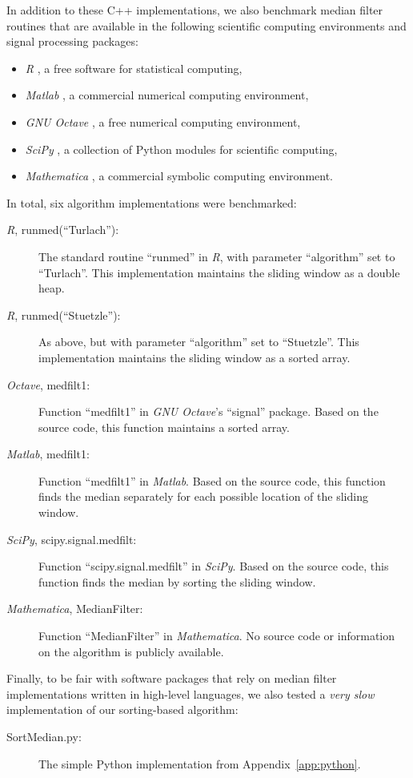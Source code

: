 \documentclass[a4paper,11pt]{article}
\newcommand{\rmfcite}{\citesoftware[p.~1507]{r-manual}}
\begin{document}
In addition to these C++ implementations, we also benchmark median filter routines that are available in the following scientific computing environments and signal processing packages:
\begin{itemize}[noitemsep]
    \item \emph{R} , a free software for statistical computing,
    \item \emph{Matlab} , a commercial numerical computing environment,
    \item \emph{GNU Octave} , a free numerical computing environment,
    \item \emph{SciPy} , a collection of Python modules for scientific computing,
    \item \emph{Mathematica} , a commercial symbolic computing environment.
\end{itemize}
In total, six algorithm implementations were benchmarked:
\begin{description}
    \item[\emph{R}, runmed(``Turlach''):] The standard routine ``runmed'' \rmfcite{} in \emph{R}, with parameter ``algorithm'' set to ``Turlach''. This implementation maintains the sliding window as a double heap.
    \item[\emph{R}, runmed(``Stuetzle''):] As above, but with parameter ``algorithm'' set to ``Stuetzle''. This implementation maintains the sliding window as a sorted array.
    \item[\emph{Octave}, medfilt1:] Function ``medfilt1''  in \emph{GNU Octave}'s ``signal'' package. Based on the source code, this function maintains a sorted array.
    \item[\emph{Matlab}, medfilt1:] Function ``medfilt1''  in \emph{Matlab}. Based on the source code, this function finds the median separately for each possible location of the sliding window.
    \item[\emph{SciPy}, scipy.signal.medfilt:] Function ``scipy.signal.medfilt''  in \emph{SciPy}. Based on the source code, this function finds the median by sorting the sliding window.
    \item[\emph{Mathematica}, MedianFilter:] Function ``MedianFilter''  in \emph{Mathematica}. No source code or information on the algorithm is publicly available.
\end{description}
Finally, to be fair with software packages that rely on median filter implementations written in high-level languages, we also tested a \emph{very slow} implementation of our sorting-based algorithm:
\begin{description}
    \item[SortMedian.py:] The simple Python implementation from Appendix~\ref{app:python}.
\end{description}
\end{document}
